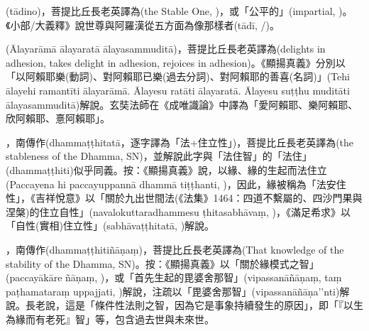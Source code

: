 \startitemgroup[noteitems]
\item{}(tādino)，菩提比丘長老英譯為(the Stable One, )，或「公平的」(impartial, )。《小部/大義釋》說世尊與阿羅漢從五方面為像那樣者(tādī, /)。
\stopitemgroup

\startitemgroup[noteitems]
\item{}(Ālayarāmā ālayaratā ālayasammuditā)，菩提比丘長老英譯為(delights in adhesion, takes delight in adhesion, rejoices in adhesion)。《顯揚真義》分別以「以阿賴耶樂(動詞)、對阿賴耶已樂(過去分詞)、對阿賴耶的善喜(名詞)」(Tehi ālayehi ramantīti ālayarāmā. Ālayesu ratāti ālayaratā. Ālayesu suṭṭhu muditāti ālayasammuditā)解說。玄奘法師在《成唯識論》中譯為「愛阿賴耶、樂阿賴耶、欣阿賴耶、憙阿賴耶」。
\stopitemgroup

\startitemgroup[noteitems]
\item{}，南傳作(dhammaṭṭhitatā，逐字譯為「法+住立性」)，菩提比丘長老英譯為(the stableness of the Dhamma, SN)，並解說此字與「法住智」的「法住」(dhammaṭṭhiti)似乎同義。按：《顯揚真義》說，以緣、緣的生起而法住立(Paccayena hi paccayuppannā dhammā tiṭṭhanti, )，因此，緣被稱為「法安住性」，《吉祥悅意》以「關於九出世間法(《法集》1464：四道不繫屬的、四沙門果與涅槃)的住立自性」(navalokuttaradhammesu ṭhitasabhāvaṃ, )，《滿足希求》以「自性(實相)住立性」(sabhāvaṭṭhitatā, )解說。
\item{}，南傳作(dhammaṭṭhitiñāṇaṃ)，菩提比丘長老英譯為(That knowledge of the stability of the Dhamma, SN)。按：《顯揚真義》以「關於緣模式之智」(paccayākāre ñāṇaṃ, )，或「首先生起的毘婆舍那智」(vipassanāñāṇaṃ, taṃ paṭhamataraṃ uppajjati, )解說，注疏以「毘婆舍那智」(vipassanāñāṇa’’nti)解說。長老說，這是「條件性法則之智，因為它是事象持續發生的原因」，即「『以生為緣而有老死』智」等，包含過去世與未來世。
\stopitemgroup

